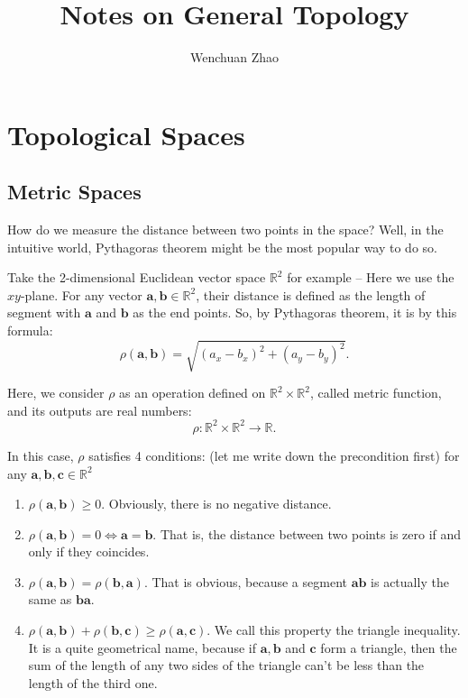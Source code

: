 \documentclass{report}
\title{Notes on General Topology}
\author{Wenchuan Zhao}
\begin{document}
\maketitle
\tableofcontents




\chapter{Topological Spaces}


\section{Metric Spaces}


How do we measure the distance between two points in the space? Well, in the intuitive world, Pythagoras theorem might be the most popular way to do so.

Take the 2-dimensional Euclidean vector space $\mathbb R^2$ for example -- Here we use the $xy$-plane. For any vector $\mathbf a, \mathbf b \in \mathbb R^2$, their distance is defined as the length of segment with $\mathbf a$ and $\mathbf b$ as the end points. So, by Pythagoras theorem, it is by this formula:
$$
\rho(\mathbf a, \mathbf b) = \sqrt{(a_x - b_x)^2 + (a_y - b_y)^2}.
$$

Here, we consider $\rho$ as an operation defined on $\mathbb R^2 \times \mathbb R^2$, called metric function, and its outputs are real numbers:
$$
\rho: \mathbb R^2 \times \mathbb R^2 \to \mathbb R.
$$

In this case, $\rho$ satisfies 4 conditions: (let me write down the precondition first) for any $\mathbf a, \mathbf b, \mathbf c \in \mathbb R^2$
\begin{enumerate}
	\item $\rho(\mathbf a, \mathbf b) \ge 0$. Obviously, there is no negative distance.
	\item $\rho(\mathbf a, \mathbf b) = 0 \iff \mathbf a = \mathbf b$. That is, the distance between two points is zero if and only if they coincides.
	\item $\rho(\mathbf a, \mathbf b) = \rho(\mathbf b, \mathbf a)$. That is obvious, because a segment $\mathbf a \mathbf b$ is actually the same as $\mathbf b \mathbf a$.
	\item $\rho(\mathbf a, \mathbf b) + \rho(\mathbf b, \mathbf c) \ge \rho(\mathbf a, \mathbf c)$. We call this property the triangle inequality. It is a quite geometrical name, because if $\mathbf a, \mathbf b$ and $\mathbf c$ form a triangle, then the sum of the length of any two sides of the triangle can't be less than the length of the third one.
\end{enumerate}
\end{document}
